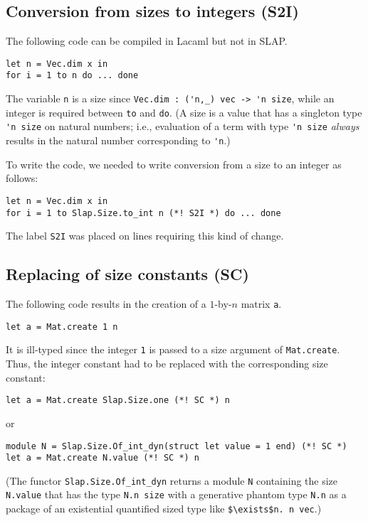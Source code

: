 \documentclass[10pt,a4paper]{article}
\begin{document}
\subsection{Conversion from sizes to integers (S2I)}
\label{sec:S2I}

The following code can be compiled in Lacaml but not in SLAP.
\begin{lstlisting}
let n = Vec.dim x in
for i = 1 to n do ... done
\end{lstlisting}
The variable \lstinline|n| is a size since
\lstinline|Vec.dim : ('n,_) vec -> 'n size|, while an integer is
required between \lstinline|to| and \lstinline|do|.
(A size is a value that has a singleton type \lstinline|'n size| on natural numbers;
i.e., evaluation of a term with type \lstinline|'n size| \emph{always}
results in the natural number corresponding to \lstinline|'n|.)

To write the code, we needed to write conversion from a size to
an integer as follows:
\begin{lstlisting}
let n = Vec.dim x in
for i = 1 to Slap.Size.to_int n (*! S2I *) do ... done
\end{lstlisting}
The label \lstinline|S2I| was placed on lines requiring this kind of change.

\subsection{Replacing of size constants (SC)}
\label{sec:SC}

The following code results in the creation of a $1$-by-$n$ matrix \lstinline|a|.
\begin{lstlisting}
let a = Mat.create 1 n
\end{lstlisting}
It is ill-typed since the integer \lstinline|1| is passed
to a size argument of \lstinline|Mat.create|.
Thus, the integer constant had to be replaced with the corresponding size constant:
\begin{lstlisting}
let a = Mat.create Slap.Size.one (*! SC *) n
\end{lstlisting}
or
\begin{lstlisting}
module N = Slap.Size.Of_int_dyn(struct let value = 1 end) (*! SC *)
let a = Mat.create N.value (*! SC *) n
\end{lstlisting}
(The functor \lstinline|Slap.Size.Of_int_dyn| returns a module
\lstinline|N| containing the size \lstinline|N.value| that has
the type \lstinline|N.n size| with a generative phantom
type \lstinline|N.n| as a package of an existential quantified
sized type like \lstinline|$\exists$n. n vec|.)
\end{document}

